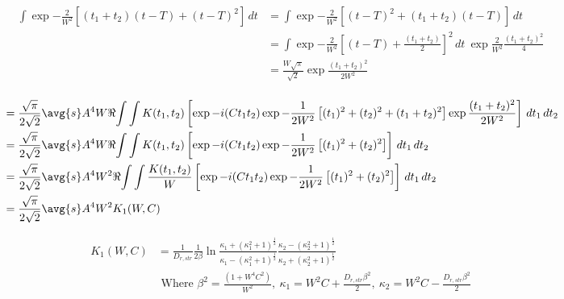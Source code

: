     \begin{equation}
      \begin{split}
      \int \exp{- \frac{2}{W^2} \left[ (t_1+t_2) (t-T)  + (t-T)^2 \right] }\,dt &=  \int \exp{ -\frac{2}{W^2} \left[ (t-T)^2 + (t_1+t_2) (t-T) \right] }\,dt \\
      &=  \int \exp{ -\frac{2}{W^2} \left[ (t-T) + \frac{(t_1+t_2)}{2}\right]^2 }\,dt \ \exp{ \frac{2}{W^2} \frac{(t_1+t_2)^2}{4} } \\
      &= \frac{W \sqrt{\pi}}{\sqrt{2}} \exp{ \frac{(t_1+t_2)^2 }{2W^2} } \\
      \end{split}
    \end{equation}

   \begin{equation}
     \begin{split}
       &= \frac{\sqrt{\pi}}{2\sqrt{2}} \avg{s} A^4 W  \Re{\int \int K(t_1,t_2) \left[\exp{-i(C t_1 t_2)} \exp{-\frac{1}{2W^2} \left[ (t_1)^2 + (t_2)^2 + (t_1 + t_2)^2 \right]} \exp{ \frac{(t_1+t_2)^2 }{2W^2} } \right] \,dt_1\,dt_2} \\
       &= \frac{\sqrt{\pi}}{2\sqrt{2}} \avg{s} A^4 W  \Re{\int \int K(t_1,t_2) \left[\exp{-i(C t_1 t_2)} \exp{-\frac{1}{2W^2} \left[ (t_1)^2 + (t_2)^2 \right]} \right] \,dt_1\,dt_2} \\
       &= \frac{\sqrt{\pi}}{2\sqrt{2}} \avg{s} A^4 W^2 \Re{\int \int \frac{K(t_1,t_2)}{W} \left[\exp{-i(C t_1 t_2)} \exp{-\frac{1}{2W^2} \left[ (t_1)^2 + (t_2)^2 \right]} \right] \,dt_1\,dt_2} \\
       &= \frac{\sqrt{\pi}}{2\sqrt{2}} \avg{s} A^4 W^2 K_1(W,C)
     \end{split}
   \end{equation}
 
\begin{equation}
\begin{split}
K_1(W,C) & =\frac{1}{D_{r,str}} \frac{1}{2\beta}  \ln{\frac{ \kappa_{1} + \left(\kappa_{1}^2+1\right)^{\frac{1}{2}}}{\kappa_{1} - \left(\kappa_{1}^2+1\right)^{\frac{1}{2}}} \frac{\kappa_{2} - \left(\kappa_{2}^2+1\right)^{\frac{1}{2}}}{\kappa_{2} + \left(\kappa_{2}^2+1\right)^{\frac{1}{2}}}}\\
&  \mbox{ Where } \beta^2 = \frac{(1+W^4C^2)}{W^2},\ \kappa_1 = W^2C + \frac{D_{r,str}\beta^2}{2},\ \kappa_2 = W^2C - \frac{D_{r,str}\beta^2}{2} \\
\end{split}
\end{equation}

